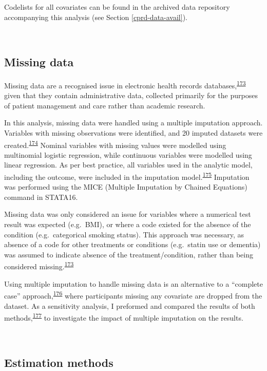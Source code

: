 \documentclass[a4paper, twoside]{templates/ociamthesis}
\begin{document}
Codelists for all covariates can be found in the archived data repository accompanying this analysis (see Section \ref{cprd-data-avail}).

~

\hypertarget{missing-data}{%
\subsection{Missing data}\label{missing-data}}

Missing data are a recognised issue in electronic health records databases,\textsuperscript{\protect\hyperlink{ref-wells2013strategies}{173}} given that they contain administrative data, collected primarily for the purposes of patient management and care rather than academic research.

In this analysis, missing data were handled using a multiple imputation approach. Variables with missing observations were identified, and 20 imputed datasets were created.\textsuperscript{\protect\hyperlink{ref-sterne2009}{174}} Nominal variables with missing values were modelled using multinomial logistic regression, while continuous variables were modelled using linear regression. As per best practice, all variables used in the analytic model, including the outcome, were included in the imputation model.\textsuperscript{\protect\hyperlink{ref-moons2006using}{175}} Imputation was performed using the MICE (Multiple Imputation by Chained Equations) command in STATA16.

Missing data was only considered an issue for variables where a numerical test result was expected (e.g.~BMI), or where a code existed for the absence of the condition (e.g.~categorical smoking status). This approach was necessary, as absence of a code for other treatments or conditions (e.g.~statin use or dementia) was assumed to indicate absence of the treatment/condition, rather than being considered missing.\textsuperscript{\protect\hyperlink{ref-wells2013strategies}{173}}

Using multiple imputation to handle missing data is an alternative to a ``complete case'' approach,\textsuperscript{\protect\hyperlink{ref-pigott2001review}{176}} where participants missing any covariate are dropped from the dataset. As a sensitivity analysis, I preformed and compared the results of both methods,\textsuperscript{\protect\hyperlink{ref-hughes2019}{177}} to investigate the impact of multiple imputation on the results.

~

\hypertarget{estimation-methods}{%
\subsection{Estimation methods}\label{estimation-methods}}
\end{document}
